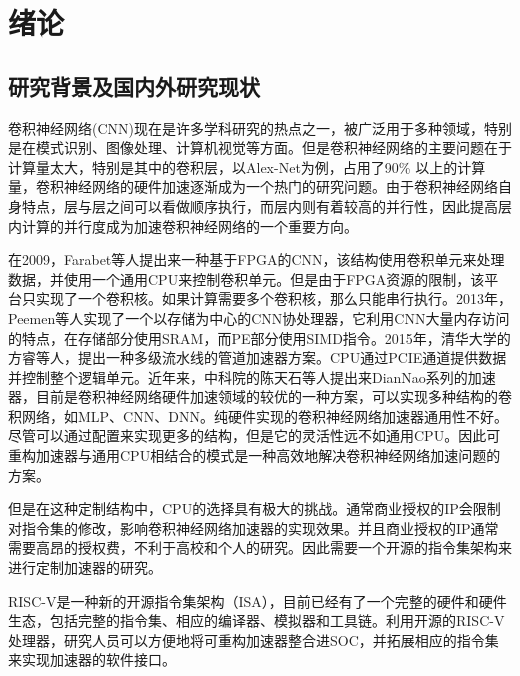 \chapter{绪论}\label{chap:introduction}

\section{研究背景及国内外研究现状}

卷积神经网络(CNN)现在是许多学科研究的热点之一，被广泛用于多种领域，特别是在模式识别、图像处理、计算机视觉等方面。但是卷积神经网络的主要问题在于计算量太大，特别是其中的卷积层，以Alex-Net为例，占用了90\%\citep{chen2016eyeriss} 以上的计算量，卷积神经网络的硬件加速逐渐成为一个热门的研究问题。由于卷积神经网络自身特点，层与层之间可以看做顺序执行，而层内则有着较高的并行性，因此提高层内计算的并行度成为加速卷积神经网络的一个重要方向。

在2009，Farabet等人提出来一种基于FPGA的CNN，该结构使用卷积单元来处理数据，并使用一个通用CPU来控制卷积单元\citep{farabet2009cnp}。但是由于FPGA资源的限制，该平台只实现了一个卷积核。如果计算需要多个卷积核，那么只能串行执行。2013年，Peemen等人实现了一个以存储为中心的CNN协处理器，它利用CNN大量内存访问的特点，在存储部分使用SRAM，而PE部分使用SIMD指令\citep{peemen2013memory}。2015年，清华大学的方睿等人，提出一种多级流水线的管道加速器方案。CPU通过PCIE通道提供数据并控制整个逻辑单元。近年来，中科院的陈天石等人提出来DianNao系列的加速器，目前是卷积神经网络硬件加速领域的较优的一种方案，可以实现多种结构的卷积网络，如MLP、CNN、DNN\citep{chen2014diannao}。纯硬件实现的卷积神经网络加速器通用性不好。尽管可以通过配置来实现更多的结构，但是它的灵活性远不如通用CPU。因此可重构加速器与通用CPU相结合的模式是一种高效地解决卷积神经网络加速问题的方案。

但是在这种定制结构中，CPU的选择具有极大的挑战。通常商业授权的IP会限制对指令集的修改，影响卷积神经网络加速器的实现效果。并且商业授权的IP通常需要高昂的授权费，不利于高校和个人的研究。因此需要一个开源的指令集架构来进行定制加速器的研究。

RISC-V是一种新的开源指令集架构（ISA）\citep{waterman2011risc}，目前已经有了一个完整的硬件和硬件生态\citep{asanovic2014instruction}，包括完整的指令集、相应的编译器、模拟器和工具链。利用开源的RISC-V处理器，研究人员可以方便地将可重构加速器整合进SOC，并拓展相应的指令集来实现加速器的软件接口。


